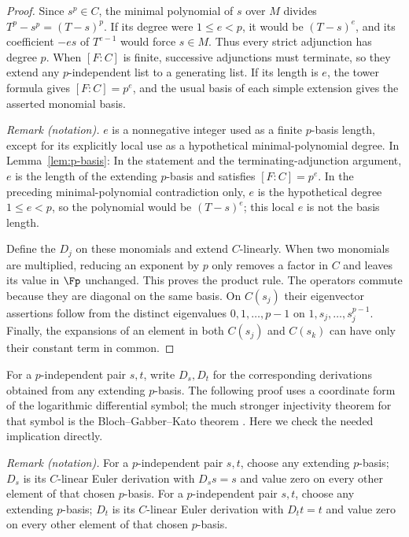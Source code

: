 \begin{proof}
Since $s^p\in C$, the minimal polynomial of $s$ over $M$ divides
$T^p-s^p=(T-s)^p$.  If its degree were $1\leq e<p$, it would be
$(T-s)^e$, and its coefficient $-es$ of $T^{e-1}$ would force $s\in M$.
Thus every strict adjunction has degree $p$.  When $[F:C]$ is finite,
successive adjunctions must terminate, so they extend any
$p$-independent list to a generating list.  If its length is $e$, the
tower formula gives $[F:C]=p^e$, and the usual basis of each simple
extension gives the asserted monomial basis.

\noindent\textit{Remark (notation).} $e$ is a nonnegative integer used as a finite $p$-basis length, except for its explicitly local use as a hypothetical minimal-polynomial degree. In Lemma~\ref{lem:p-basis}: In the statement and the terminating-adjunction argument, $e$ is the length of the extending $p$-basis and satisfies $[F:C]=p^e$. In the preceding minimal-polynomial contradiction only, $e$ is the hypothetical degree $1\leq e<p$, so the polynomial would be $(T-s)^e$; this local $e$ is not the basis length.


Define the $D_j$ on these monomials and extend $C$-linearly.  When two
monomials are multiplied, reducing an exponent by $p$ only removes a
factor in $C$ and leaves its value in $\Fp$ unchanged.  This proves the
product rule.  The operators commute because they are diagonal on the
same basis.  On $C(s_j)$ their eigenvector assertions follow from the
distinct eigenvalues $0,1,\ldots,p-1$ on $1,s_j,\ldots,s_j^{p-1}$.
Finally, the expansions of an element in both $C(s_j)$ and $C(s_k)$
can have only their constant term in common.
\end{proof}

For a $p$-independent pair $s,t$, write $D_s,D_t$ for the corresponding
derivations obtained from any extending $p$-basis.  The following proof
uses a coordinate form of the logarithmic differential symbol;
the much stronger injectivity theorem for that symbol is the
Bloch--Gabber--Kato theorem \citep[Theorem~(2.1)]{BlochKato1986}.
Here we check the needed implication directly.

\noindent\textit{Remark (notation).} For a $p$-independent pair $s,t$, choose any extending $p$-basis; $D_s$ is its $C$-linear Euler derivation with $D_s s=s$ and value zero on every other element of that chosen $p$-basis. For a $p$-independent pair $s,t$, choose any extending $p$-basis; $D_t$ is its $C$-linear Euler derivation with $D_t t=t$ and value zero on every other element of that chosen $p$-basis.


